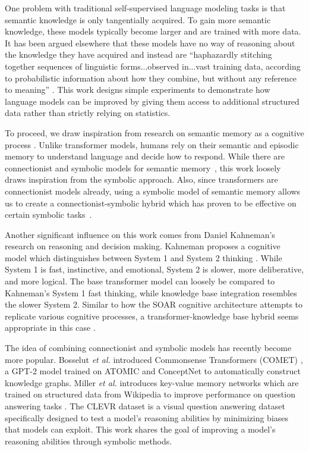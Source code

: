 \documentclass[phd,electronic,oneside,twosidetoc,letterpaper,chaptercenter,parttop,lof]{byumsphd}
\begin{document}
One problem with traditional self-supervised language modeling tasks is that semantic knowledge is only tangentially acquired.
To gain more semantic knowledge, these models typically become larger and are trained with more data.
It has been argued elsewhere that these models have no way of reasoning about the knowledge they have acquired and instead are ``haphazardly stitching together sequences of linguistic forms...observed in...vast training data, according to probabilistic information about how they combine, but without any reference to meaning'' \cite{bender2021dangers}.
This work designs simple experiments to demonstrate how language models can be improved by giving them access to additional structured data rather than strictly relying on statistics.

To proceed, we draw inspiration from research on semantic memory as a cognitive process \cite{tulving1972episodic}. 
Unlike transformer models, humans rely on their semantic and episodic memory to understand language and decide how to respond.
While there are connectionist and symbolic models for semantic memory~\cite{jones2015models}, this work loosely draws inspiration from the symbolic approach.
Also, since transformers are connectionist models already, using a symbolic model of semantic memory allows us to create a connectionist-symbolic hybrid which has proven to be effective on certain symbolic tasks~\cite{mao2019neuro}.

Another significant influence on this work comes from Daniel Kahneman's research on reasoning and decision making.
Kahneman proposes a cognitive model which distinguishes between System 1 and System 2 thinking \cite{kahneman2011thinking}. While System 1 is fast, instinctive, and emotional, System 2 is slower, more deliberative, and more logical. 
The base transformer model can loosely be compared to Kahneman's System 1 fast thinking, while knowledge base integration resembles the slower System 2.
Similar to how the SOAR cognitive architecture attempts to replicate various cognitive processes, a transformer-knowledge base hybrid seems appropriate in this case \cite{laird2012soar}.

The idea of combining connectionist and symbolic models has recently become more popular. 
Bosselut \textit{et al.} introduced Commonsense Transformers (COMET) \cite{bosselut2019comet}, a GPT-2 model trained on ATOMIC \cite{sap2019atomic} and ConceptNet \cite{liu2004conceptnet} to automatically construct knowledge graphs.
Miller \textit{et al.} introduces key-value memory networks which are trained on structured data from Wikipedia to improve performance on question answering tasks \cite{miller2016key}.
The CLEVR dataset \cite{johnson2017clevr} is a visual question answering dataset specifically designed to test a model's reasoning abilities by minimizing biases that models can exploit.
This work shares the goal of improving a model's reasoning abilities through symbolic methods.
\end{document}
